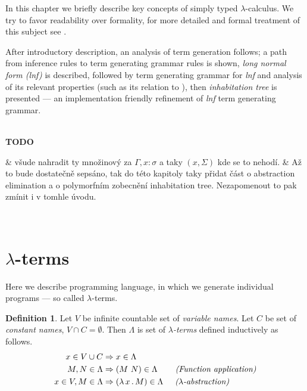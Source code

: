 \documentclass[12pt,a4paper]{report}
\newcommand{\lterms}{$\lambda$-terms\xspace}
\newenvironment{todo}
{ ~\\[0.5em]
  {\color{red}\textbf{TODO}}
  \begin{easylist}[itemize]}
{ \end{easylist}
  ~}
\begin{document}
\newcommand{\lnf}{\textit{lnf}\xspace}


In this chapter we briefly describe key concepts
of simply typed $\lambda$-calculus.
We try to favor readability over formality,
for more detailed and formal treatment of this subject see 
\cite{barendregt92,barendregt10}.

After introductory description, an analysis of term generation follows; 
a path from inference rules to term generating grammar rules is shown,
\textit{long normal form (lnf)} is described,
followed by term generating grammar for \textit{lnf}
and analysis of its relevant properties (such as its relation to \benf),
then \textit{inhabitation tree} is presented --- 
an implementation friendly refinement of 
\textit{lnf} term generating grammar.

\begin{todo}
 & všude nahradit ty množinový za $\Gamma , x:\sigma$ a taky $(x,\Sigma)$ kde se to nehodí.
 & Až to bude dostatečně sepsáno, tak do této kapitoly taky přidat
   část o abstraction elimination a o polymorfním zobecnění inhabitation tree.
   Nezapomenout to pak zmínit i v tomhle úvodu.
\end{todo}
	
\theoremstyle{plain} 
\newtheorem{theorem}{Theorem} 
\newtheorem{proposition}{Proposition} 
\newtheorem{lemma}{Lemma} 
\newtheorem*{corollary}{Corollary}

\theoremstyle{definition} 
\newtheorem*{definition}{Definition} 
\newtheorem{conjecture}{Conjecture}
 \newtheorem*{example}{Example} 

\theoremstyle{remark} 
\newtheorem*{remark}{Remark} 
\newtheorem*{note}{Note} 
\newtheorem{case}{Case}

		
\section{\lterms}
\label{deflam}

Here we  %
describe programming language, 
in which we generate individual programs --- so called \lterms.  






\begin{definition}

Let $V$ be infinite countable set of {\it 
variable names}. Let $C$ be set of {\it constant names}, 
$V \cap C = \emptyset$.	 	
Then $\Lambda$ is set of {\it \lterms} defined inductively as follows.	
\begin{align*}
x   \in V \cup C  &\Rightarrow x     \in \Lambda \\
M,N \in \Lambda   &\Rightarrow (M~N) \in \Lambda 
\textit{~~~~~~(Function application)} \\
x   \in V , M \in \Lambda &\Rightarrow ( \lambda \, x \, . \, M ) \in \Lambda
\textit{~~~~($\lambda$-abstraction)} 
\end{align*}~
\end{definition}
\end{document}
